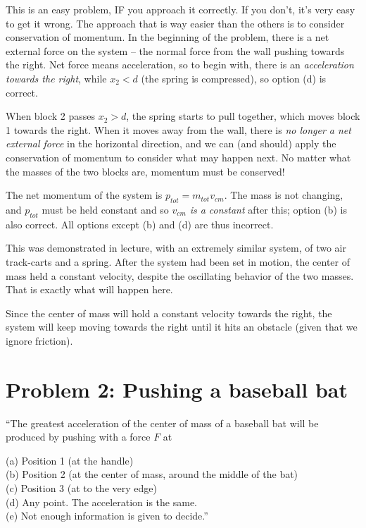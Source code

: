 \documentclass[8.01x]{subfiles}
\begin{document}
This is an easy problem, IF you approach it correctly. If you don't, it's very easy to get it wrong. The approach that is way easier than the others is to consider conservation of momentum. In the beginning of the problem, there is a net external force on the system -- the normal force from the wall pushing towards the right. Net force means acceleration, so to begin with, there is an \emph{acceleration towards the right}, while $x_2 < d$ (the spring is compressed), so option (d) is correct.

When block 2 passes $x_2 > d$, the spring starts to pull together, which moves block 1 towards the right. When it moves away from the wall, there is \emph{no longer a net external force} in the horizontal direction, and we can (and should) apply the conservation of momentum to consider what may happen next. No matter what the masses of the two blocks are, momentum must be conserved!

The net momentum of the system is $p_{tot} = m_{tot} v_{cm}$. The mass is not changing, and $p_{tot}$ must be held constant and so $v_{cm}$ \emph{is a constant} after this; option (b) is also correct. All options except (b) and (d) are thus incorrect.

This was demonstrated in lecture, with an extremely similar system, of two air track-carts and a spring. After the system had been set in motion, the center of mass held a constant velocity, despite the oscillating behavior of the two masses. That is exactly what will happen here.

Since the center of mass will hold a constant velocity towards the right, the system will keep moving towards the right until it hits an obstacle (given that we ignore friction).

\section{Problem 2: Pushing a baseball bat}

``The greatest acceleration of the center of mass of a baseball bat will be produced by pushing with a force $F$ at

(a) Position 1 (at the handle)\\
(b) Position 2 (at the center of mass, around the middle of the bat)\\
(c) Position 3 (at to the very edge)\\
(d) Any point. The acceleration is the same.\\
(e) Not enough information is given to decide.''
\end{document}
